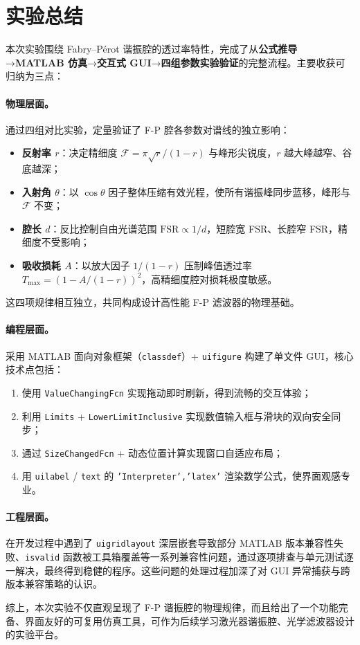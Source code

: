 \documentclass[10.5pt]{config}
\begin{document}
\clearpage
\section{实验总结}

本次实验围绕 Fabry--P\'erot 谐振腔的透过率特性，完成了从\textbf{公式推导}→\textbf{MATLAB 仿真}→\textbf{交互式 GUI}→\textbf{四组参数实验验证}的完整流程。主要收获可归纳为三点：

\paragraph{物理层面。}通过四组对比实验，定量验证了 F-P 腔各参数对谱线的独立影响：
\begin{itemize}
    \item \textbf{反射率 $r$}：决定精细度 $\mathcal{F}=\pi\sqrt{r}/(1-r)$ 与峰形尖锐度，$r$ 越大峰越窄、谷底越深；
    \item \textbf{入射角 $\theta$}：以 $\cos\theta$ 因子整体压缩有效光程，使所有谐振峰同步蓝移，峰形与 $\mathcal{F}$ 不变；
    \item \textbf{腔长 $d$}：反比控制自由光谱范围 $\mathrm{FSR}\propto 1/d$，短腔宽 FSR、长腔窄 FSR，精细度不受影响；
    \item \textbf{吸收损耗 $A$}：以放大因子 $1/(1-r)$ 压制峰值透过率 $T_{\max}=(1-A/(1-r))^2$，高精细度腔对损耗极度敏感。
\end{itemize}
这四项规律相互独立，共同构成设计高性能 F-P 滤波器的物理基础。

\paragraph{编程层面。}采用 MATLAB 面向对象框架（\texttt{classdef}）+ \texttt{uifigure} 构建了单文件 GUI，核心技术点包括：
\begin{enumerate}
    \item 使用 \texttt{ValueChangingFcn} 实现拖动即时刷新，得到流畅的交互体验；
    \item 利用 \texttt{Limits} + \texttt{LowerLimitInclusive} 实现数值输入框与滑块的双向安全同步；
    \item 通过 \texttt{SizeChangedFcn} + 动态位置计算实现窗口自适应布局；
    \item 用 \texttt{uilabel} / \texttt{text} 的 \texttt{'Interpreter','latex'} 渲染数学公式，使界面观感专业。
\end{enumerate}

\paragraph{工程层面。}在开发过程中遇到了 \texttt{uigridlayout} 深层嵌套导致部分 MATLAB 版本兼容性失败、\texttt{isvalid} 函数被工具箱覆盖等一系列兼容性问题，通过逐项排查与单元测试逐一解决，最终得到稳健的程序。这些问题的处理过程加深了对 GUI 异常捕获与跨版本兼容策略的认识。

综上，本次实验不仅直观呈现了 F-P 谐振腔的物理规律，而且给出了一个功能完备、界面友好的可复用仿真工具，可作为后续学习激光器谐振腔、光学滤波器设计的实验平台。
\end{document}

